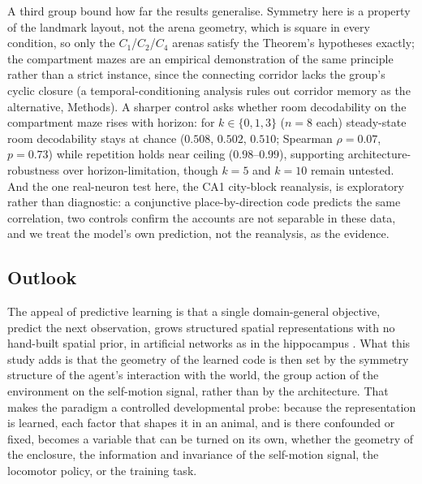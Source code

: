 \documentclass[9pt,lineno]{elife}
\begin{document}
A third group bound how far the results generalise. Symmetry here is a property of the landmark layout,
not the arena geometry, which is square in every condition, so only the $C_1$/$C_2$/$C_4$ arenas satisfy
the Theorem's hypotheses exactly; the compartment mazes are an empirical demonstration of the same
principle rather than a strict instance, since the connecting corridor lacks the group's cyclic closure
(a temporal-conditioning analysis rules out corridor memory as the alternative, Methods). A sharper
control asks whether room decodability on the compartment maze rises with horizon: for $k \in \{0,1,3\}$
($n = 8$ each) steady-state room decodability stays at chance ($0.508$, $0.502$, $0.510$; Spearman
$\rho = 0.07$, $p = 0.73$) while repetition holds near ceiling ($0.98$--$0.99$), supporting
architecture-robustness over horizon-limitation, though $k = 5$ and $k = 10$ remain untested. And the one
real-neuron test here, the CA1 city-block reanalysis, is exploratory rather than diagnostic: a
conjunctive place-by-direction code predicts the same correlation, two controls confirm the accounts are
not separable in these data, and we treat the model's own prediction, not the reanalysis, as the
evidence.

\subsection*{Outlook}

The appeal of predictive learning is that a single domain-general objective, predict the next
observation, grows structured spatial representations with no hand-built spatial prior, in artificial
networks as in the hippocampus \citep{levenstein2024, stachenfeld2017}. What this study adds is that the
geometry of the learned code is then set by the symmetry structure of the agent's interaction with the
world, the group action of the environment on the self-motion signal, rather than by the architecture.
That makes the paradigm a controlled developmental probe: because the representation is learned, each
factor that shapes it in an animal, and is there confounded or fixed, becomes a variable that can be
turned on its own, whether the geometry of the enclosure, the information and invariance of the
self-motion signal, the locomotor policy, or the training task.
\end{document}
